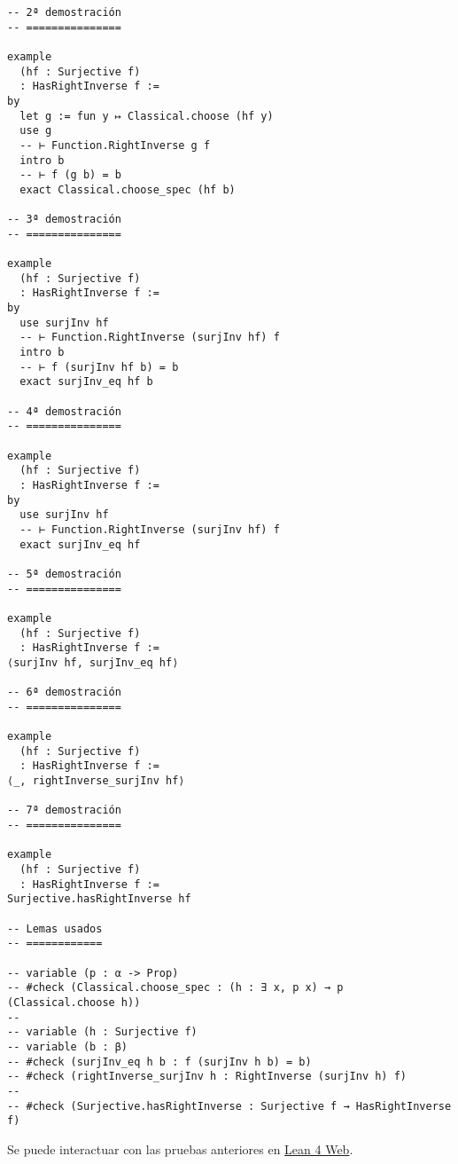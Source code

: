 \begin{verbatim}
-- 2ª demostración
-- ===============

example
  (hf : Surjective f)
  : HasRightInverse f :=
by
  let g := fun y ↦ Classical.choose (hf y)
  use g
  -- ⊢ Function.RightInverse g f
  intro b
  -- ⊢ f (g b) = b
  exact Classical.choose_spec (hf b)

-- 3ª demostración
-- ===============

example
  (hf : Surjective f)
  : HasRightInverse f :=
by
  use surjInv hf
  -- ⊢ Function.RightInverse (surjInv hf) f
  intro b
  -- ⊢ f (surjInv hf b) = b
  exact surjInv_eq hf b

-- 4ª demostración
-- ===============

example
  (hf : Surjective f)
  : HasRightInverse f :=
by
  use surjInv hf
  -- ⊢ Function.RightInverse (surjInv hf) f
  exact surjInv_eq hf

-- 5ª demostración
-- ===============

example
  (hf : Surjective f)
  : HasRightInverse f :=
⟨surjInv hf, surjInv_eq hf⟩

-- 6ª demostración
-- ===============

example
  (hf : Surjective f)
  : HasRightInverse f :=
⟨_, rightInverse_surjInv hf⟩

-- 7ª demostración
-- ===============

example
  (hf : Surjective f)
  : HasRightInverse f :=
Surjective.hasRightInverse hf

-- Lemas usados
-- ============

-- variable (p : α -> Prop)
-- #check (Classical.choose_spec : (h : ∃ x, p x) → p (Classical.choose h))
--
-- variable (h : Surjective f)
-- variable (b : β)
-- #check (surjInv_eq h b : f (surjInv h b) = b)
-- #check (rightInverse_surjInv h : RightInverse (surjInv h) f)
--
-- #check (Surjective.hasRightInverse : Surjective f → HasRightInverse f)
\end{verbatim}
Se puede interactuar con las pruebas anteriores en \href{https://lean.math.hhu.de/\#url=https://raw.githubusercontent.com/jaalonso/Calculemus2/main/src/Las\_funciones\_suprayectivas\_tienen\_inversa\_por\_la\_derecha.lean}{Lean 4 Web}.

